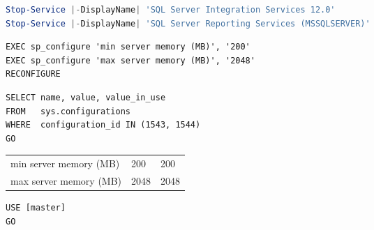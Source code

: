 \begin{enumerate}
\begin{lstlisting}[language=powershell, caption={Stoppen und
        umkonfigurieren von Diensten}, label=admin_03_loesung_03]
Stop-Service |-DisplayName| 'SQL Server Integration Services 12.0'
Stop-Service |-DisplayName| 'SQL Server Reporting Services (MSSQLSERVER)'     
        \end{lstlisting}
        
        \begin{lstlisting}[language=ms_sql, caption={Ändern der
        Servereigenschaften}, label=admin_03_loesung_04]
EXEC sp_configure 'min server memory (MB)', '200'
EXEC sp_configure 'max server memory (MB)', '2048'
RECONFIGURE
        \end{lstlisting}
        
        \begin{lstlisting}[language=ms_sql, caption={Ändern der
        Servereigenschaften}, label=admin_03_loesung_05]
SELECT name, value, value_in_use
FROM   sys.configurations
WHERE  configuration_id IN (1543, 1544)
GO
        \end{lstlisting}
        \begin{center}
          \begin{small}
            \tablehead{}
            \begin{mssql}
              \begin{supertabular}{lll}
                min server memory (MB) & 200 & 200 \\
                max server memory (MB) & 2048 & 2048 \\
              \end{supertabular}
            \end{mssql}
          \end{small}
        \end{center}
        
        \begin{lstlisting}[language=ms_sql, caption={Ändern der
        Servereigenschaften}, label=admin_03_loesung_06]
USE [master]
GO


\end{lstlisting}
\end{enumerate}
